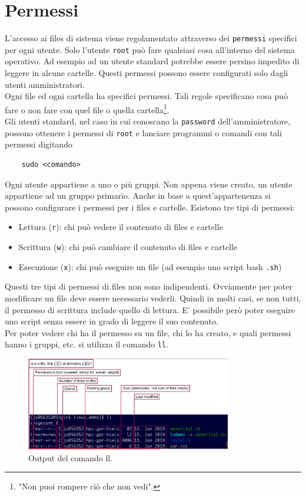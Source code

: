 \documentclass[11pt]{book}
\begin{document}
\section{Permessi}
L'accesso ai files di sistema viene regolamentato attraverso dei \verb"permessi" specifici per ogni utente. Solo l'utente \verb"root" può fare qualsiasi cosa all'interno del sistema operativo. Ad esempio ad un utente standard potrebbe essere persino impedito di leggere in alcune cartelle. Questi permessi possono essere configurati solo dagli utenti amministratori. \\
Ogni file ed ogni cartella ha specifici permessi. Tali regole specificano cosa può fare o non fare con quel file o quella cartella\footnote{"Non puoi rompere ciò che non vedi".}.\\
Gli utenti standard, nel caso in cui conoscano la \verb"password" dell'amministratore, possono ottenere i permessi di \verb"root" e lanciare programmi o comandi con tali permessi digitando
\begin{verbatim}
	sudo <comando>
\end{verbatim}

Ogni utente appartiene a uno o più gruppi. Non appena viene creato, un utente appartiene ad un gruppo primario. Anche in base a quest'appartenenza si possono configurare i permessi per i files e cartelle. Esistono tre tipi di permessi:
\begin{itemize}
	\item Lettura (\verb"r"): chi può vedere il contenuto di files e cartelle
	\item Scrittura (\verb"w"): chi può cambiare il contenuto di files e cartelle
	\item Esecuzione (\verb"x"): chi può eseguire un file (ad esempio uno script bash \verb".sh")
\end{itemize}

Questi tre tipi di permessi di files non sono indipendenti. Ovviamente per poter modificare un file deve essere necessario vederli. Quindi in molti casi, se non tutti, il permesso di scrittura include quello di lettura. E' possibile però poter eseguire uno script senza essere in grado di leggere il suo contenuto. \\
Per poter vedere chi ha il permesso su un file, chi lo ha creato, e quali permessi hanno i gruppi, etc. si utilizza il comando \verb"ll".

\begin{figure}
	\centering
	\includegraphics[width=0.8\textwidth]{img/permessi.png}
	\caption{Output del comando ll.}
	\label{llcommand}
\end{figure}
\end{document}
